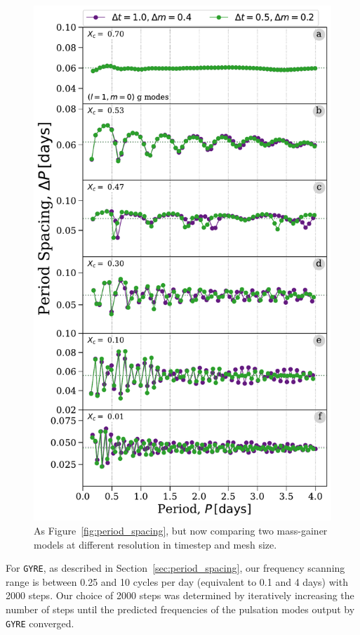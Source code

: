 \documentclass[twocolumn, twocolappendix, oneside]{aastex631}
\newcommand{\gyre}{\texttt{GYRE}\xspace}
\begin{document}
\begin{figure}
    \centering
    \includegraphics[width=\columnwidth]{paper/figures/period_spacing_convergence.pdf}
    \caption{As Figure~\ref{fig:period_spacing}, but now comparing two mass-gainer models at different resolution in timestep and mesh size.}
    \label{fig:period_spacing_convergence}
\end{figure}

For \gyre, as described in Section~\ref{sec:period_spacing}, our frequency scanning range is between 0.25 and 10 cycles per day (equivalent to 0.1 and 4 days) with 2000 steps. Our choice of 2000 steps was determined by iteratively increasing the number of steps until the predicted frequencies of the pulsation modes output by \gyre converged.
\end{document}
